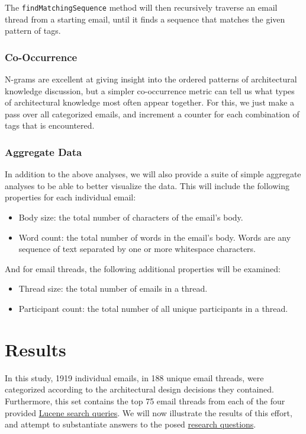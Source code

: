 \documentclass[a4paper, 12pt]{article}
\begin{document}
			The \texttt{findMatchingSequence} method will then recursively traverse an email thread from a starting email, until it finds a sequence that matches the given pattern of tags.
			
		\subsubsection{Co-Occurrence}
			N-grams are excellent at giving insight into the ordered patterns of architectural knowledge discussion, but a simpler co-occurrence metric can tell us what types of architectural knowledge most often appear together. For this, we just make a pass over all categorized emails, and increment a counter for each combination of tags that is encountered.
			
		\subsubsection{Aggregate Data}
			In addition to the above analyses, we will also provide a suite of simple aggregate analyses to be able to better visualize the data. This will include the following properties for each individual email:
			
			\begin{itemize}
				\item Body size: the total number of characters of the email's body.
				\item Word count: the total number of words in the email's body. Words are any sequence of text separated by one or more whitespace characters.
			\end{itemize}
		
			And for email threads, the following additional properties will be examined:
			
			\begin{itemize}
				\item Thread size: the total number of emails in a thread.
				\item Participant count: the total number of all unique participants in a thread.
			\end{itemize}

\section{Results}
	In this study, 1919 individual emails, in 188 unique email threads, were categorized according to the architectural design decisions they contained. Furthermore, this set contains the top 75 email threads from each of the four provided \hyperref[sec:queries]{Lucene search queries}. We will now illustrate the results of this effort, and attempt to substantiate answers to the posed \hyperref[sec:research-questions]{research questions}.
	
\end{document}
